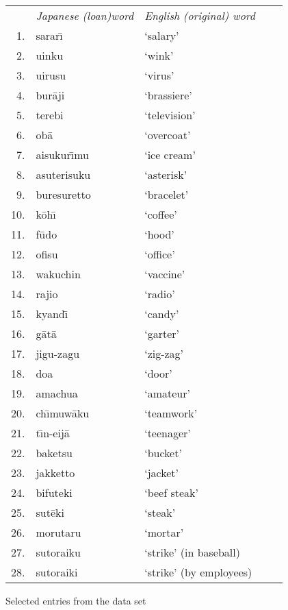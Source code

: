 \documentclass[12pt]{article}
\begin{document}
\begin{figure}
\begin{center}
\begin{tabular}{rllll}
& {\it Japanese (loan)word} & {\it English (original) word} \\
1. & sarar\={\i} & `salary' \\
2. & uinku & `wink' \\
3. & uirusu & `virus' \\
4. & bur\={a}ji & `brassiere' \\
5. & terebi & `television' \\
6. & ob\={a} & `overcoat' \\
7. & aisukur\={\i}mu & `ice cream' \\
8. & asuterisuku & `asterisk' \\
9. & buresuretto & `bracelet' \\
10. & k\={o}h\={\i} & `coffee' \\
11. & f\={u}do & `hood' \\
12. & ofisu & `office' \\
13. & wakuchin & `vaccine' \\
14. & rajio & `radio' \\
15. & kyand\={\i} & `candy' \\
16. & g\={a}t\={a} & `garter' \\
17. & jigu-zagu & `zig-zag' \\
18. & doa & `door' \\
19. & amachua & `amateur' \\
20. & ch\={\i}muw\={a}ku & `teamwork' \\
21. & t\={\i}n-eij\={a} & `teenager' \\
22. & baketsu & `bucket' \\
23. & jakketto & `jacket' \\
24. & bifuteki & `beef steak' \\
25. & sut\={e}ki & `steak' \\
26. & morutaru & `mortar' \\
27. & sutoraiku & `strike' (in baseball) \\
28. & sutoraiki & `strike' (by employees) \\
\end{tabular}
\end{center}
\caption{Selected entries from the data set}
\label{data}
\end{figure}
\end{document}
